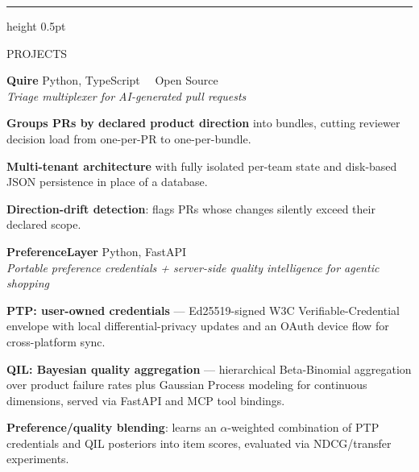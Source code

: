 \documentclass[10pt,letterpaper]{article}
\newcommand{\sechead}[1]{{\spacedboldfont\color{darktext}\fontsize{9.5}{11}\selectfont #1}\par\vspace{5pt}}
\newcommand{\subhead}[1]{{\bfseries\color{darktext}\fontsize{9.5}{12}\selectfont #1}}
\begin{document}
\begin{lrbox}{\maincolbox}
\begin{minipage}[t]{5.55in}
\begin{minipage}[t]{5.05in}
\vspace{9pt}
{\color{lightrule}\hrule height 0.5pt}
\vspace{9pt}

\sechead{PROJECTS}

\subhead{Quire} \hfill {\fontsize{8.5}{10}\selectfont\color{midgray} Python, TypeScript \ \textbullet\ Open Source}\\
{\fontsize{8.7}{11.5}\selectfont\color{midgray}\textit{Triage multiplexer for AI-generated pull requests}}
\begin{tightlist}
\item {\fontsize{8.8}{12.3}\selectfont\color{darktext} \textbf{Groups PRs by declared product direction} into bundles, cutting reviewer decision load from one-per-PR to one-per-bundle.}
\item {\fontsize{8.8}{12.3}\selectfont\color{darktext} \textbf{Multi-tenant architecture} with fully isolated per-team state and disk-based JSON persistence in place of a database.}
\item {\fontsize{8.8}{12.3}\selectfont\color{darktext} \textbf{Direction-drift detection}: flags PRs whose changes silently exceed their declared scope.}
\end{tightlist}

\vspace{10pt}
\subhead{PreferenceLayer} \hfill {\fontsize{8.5}{10}\selectfont\color{midgray} Python, FastAPI}\\
{\fontsize{8.7}{11.5}\selectfont\color{midgray}\textit{Portable preference credentials + server-side quality intelligence for agentic shopping}}
\begin{tightlist}
\item {\fontsize{8.8}{12.3}\selectfont\color{darktext} \textbf{PTP: user-owned credentials} --- Ed25519-signed W3C Verifiable-Credential envelope with local differential-privacy updates and an OAuth device flow for cross-platform sync.}
\item {\fontsize{8.8}{12.3}\selectfont\color{darktext} \textbf{QIL: Bayesian quality aggregation} --- hierarchical Beta-Binomial aggregation over product failure rates plus Gaussian Process modeling for continuous dimensions, served via FastAPI and MCP tool bindings.}
\item {\fontsize{8.8}{12.3}\selectfont\color{darktext} \textbf{Preference/quality blending}: learns an $\alpha$-weighted combination of PTP credentials and QIL posteriors into item scores, evaluated via NDCG/transfer experiments.}
\end{tightlist}


\end{minipage}
\end{minipage}
\end{lrbox}
\end{document}
